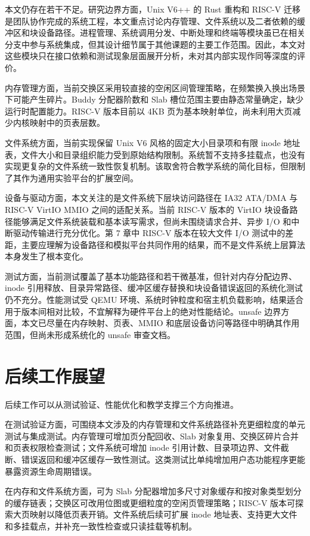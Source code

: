 本文仍存在若干不足。研究边界方面，Unix V6++ 的 Rust 重构和 RISC-V 迁移是团队协作完成的系统工程，本文重点讨论内存管理、文件系统以及二者依赖的缓冲区和块设备路径。进程管理、系统调用分发、中断处理和终端等模块虽已在相关分支中参与系统集成，但其设计细节属于其他课题的主要工作范围。因此，本文对这些模块只在接口依赖和测试现象层面展开分析，未对其内部实现作同等深度的评价。

内存管理方面，当前交换区采用较直接的空闲区间管理策略，在频繁换入换出场景下可能产生碎片。Buddy 分配器阶数和 Slab 槽位范围主要由静态常量确定，缺少运行时配置能力。RISC-V 版本目前以 4KB 页为基本映射单位，尚未利用大页减少内核映射中的页表层数。

文件系统方面，当前实现保留 Unix V6 风格的固定大小目录项和有限 inode 地址表，文件大小和目录组织能力受到原始结构限制。系统暂不支持多挂载点，也没有实现更复杂的文件系统一致性恢复机制。该取舍符合教学系统的简化目标，但限制了其作为通用实验平台的扩展空间。

设备与驱动方面，本文关注的是文件系统下层块访问路径在 IA32 ATA/DMA 与 RISC-V VirtIO MMIO 之间的适配关系。当前 RISC-V 版本的 VirtIO 块设备路径能够满足文件系统装载和基本读写需求，但尚未围绕请求合并、异步 I/O 和中断驱动传输进行充分优化。第 7 章中 RISC-V 版本在较大文件 I/O 测试中的差距，主要应理解为设备路径和模拟平台共同作用的结果，而不是文件系统上层算法本身发生了根本变化。

测试方面，当前测试覆盖了基本功能路径和若干微基准，但针对内存分配边界、inode 引用释放、目录异常路径、缓冲区缓存替换和块设备错误返回的系统化测试仍不充分。性能测试受 QEMU 环境、系统时钟粒度和宿主机负载影响，结果适合用于版本间相对比较，不宜解释为硬件平台上的绝对性能结论。unsafe 边界方面，本文已尽量在内存映射、页表、MMIO 和底层设备访问等路径中明确其作用范围，但尚未形成系统化的 unsafe 审查文档。

\section{后续工作展望}

后续工作可以从测试验证、性能优化和教学支撑三个方向推进。

在测试验证方面，可围绕本文涉及的内存管理和文件系统路径补充更细粒度的单元测试与集成测试。内存管理可增加页分配回收、Slab 对象复用、交换区碎片合并和页表权限检查测试；文件系统可增加 inode 引用计数、目录项边界、文件截断、错误返回和缓冲区缓存一致性测试。这类测试比单纯增加用户态功能程序更能暴露资源生命周期错误。

在内存和文件系统方面，可为 Slab 分配器增加多尺寸对象缓存和按对象类型划分的缓存链表；交换区可改用位图或更细粒度的空闲页管理策略；RISC-V 版本可探索大页映射以降低页表开销。文件系统后续可扩展 inode 地址表、支持更大文件和多挂载点，并补充一致性检查或只读挂载等机制。

